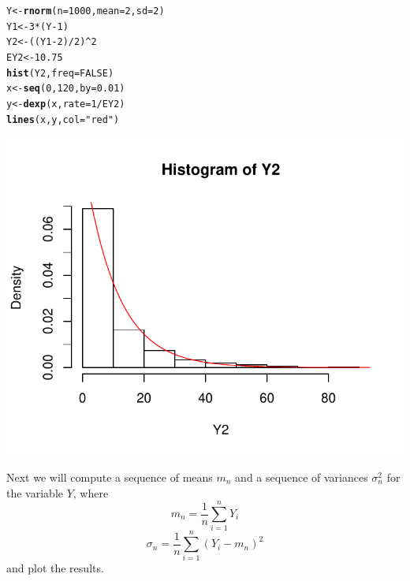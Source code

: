 \documentclass[12pt, a4paper]{article}\usepackage[]{graphicx}\usepackage[]{color}
\makeatletter
\def\maxwidth{ %
  \ifdim\Gin@nat@width>\linewidth
    \linewidth
  \else
    \Gin@nat@width
  \fi
}
\newcommand{\hlnum}[1]{\textcolor[rgb]{0.686,0.059,0.569}{#1}}%
\newcommand{\hlstr}[1]{\textcolor[rgb]{0.192,0.494,0.8}{#1}}%
\newcommand{\hlopt}[1]{\textcolor[rgb]{0,0,0}{#1}}%
\newcommand{\hlstd}[1]{\textcolor[rgb]{0.345,0.345,0.345}{#1}}%
\newcommand{\hlkwb}[1]{\textcolor[rgb]{0.69,0.353,0.396}{#1}}%
\newcommand{\hlkwc}[1]{\textcolor[rgb]{0.333,0.667,0.333}{#1}}%
\newcommand{\hlkwd}[1]{\textcolor[rgb]{0.737,0.353,0.396}{\textbf{#1}}}%
\newenvironment{kframe}{%
 \def\at@end@of@kframe{}%
 \ifinner\ifhmode%
  \def\at@end@of@kframe{\end{minipage}}%
  \begin{minipage}{\columnwidth}%
 \fi\fi%
 \def\FrameCommand##1{\hskip\@totalleftmargin \hskip-\fboxsep
 \colorbox{shadecolor}{##1}\hskip-\fboxsep
     \hskip-\linewidth \hskip-\@totalleftmargin \hskip\columnwidth}%
 \MakeFramed {\advance\hsize-\width
   \@totalleftmargin\z@ \linewidth\hsize
   \@setminipage}}%
 {\par\unskip\endMakeFramed%
 \at@end@of@kframe}
\newenvironment{knitrout}{}{} %
\makeatother
\begin{document}
\begin{knitrout}
\color{fgcolor}\begin{kframe}
\begin{alltt}
\hlstd{Y} \hlkwb{<-} \hlkwd{rnorm}\hlstd{(}\hlkwc{n} \hlstd{=} \hlnum{1000}\hlstd{,} \hlkwc{mean} \hlstd{=} \hlnum{2}\hlstd{,} \hlkwc{sd} \hlstd{=} \hlnum{2}\hlstd{)}
\hlstd{Y1} \hlkwb{<-} \hlnum{3} \hlopt{*} \hlstd{(Y} \hlopt{-} \hlnum{1}\hlstd{)}
\hlstd{Y2} \hlkwb{<-} \hlstd{((Y1} \hlopt{-} \hlnum{2}\hlstd{)} \hlopt{/} \hlnum{2}\hlstd{)} \hlopt{^} \hlnum{2}
\hlstd{EY2} \hlkwb{<-} \hlnum{10.75}
\hlkwd{hist}\hlstd{(Y2,} \hlkwc{freq} \hlstd{=} \hlnum{FALSE}\hlstd{)}
\hlstd{x} \hlkwb{<-} \hlkwd{seq}\hlstd{(}\hlnum{0}\hlstd{,} \hlnum{120}\hlstd{,} \hlkwc{by} \hlstd{=} \hlnum{0.01}\hlstd{)}
\hlstd{y} \hlkwb{<-} \hlkwd{dexp}\hlstd{(x,} \hlkwc{rate} \hlstd{=} \hlnum{1} \hlopt{/} \hlstd{EY2)}
\hlkwd{lines}\hlstd{(x, y,} \hlkwc{col} \hlstd{=} \hlstr{"red"}\hlstd{)}
\end{alltt}
\end{kframe}

{\centering \includegraphics[width=\maxwidth]{figure/ex1_2hist-1} 

}



\end{knitrout}
Next we will compute a sequence of means $m_n$ and a sequence of variances $\sigma_n^2$ for the variable $Y$, where
\[ m_n = \frac{1}{n} \sum_{i=1}^{n} Y_i \]
\[ \sigma_n = \frac{1}{n} \sum_{i=1}^{n} (Y_i - m_n)^2 \]
and plot the results.
\end{document}
